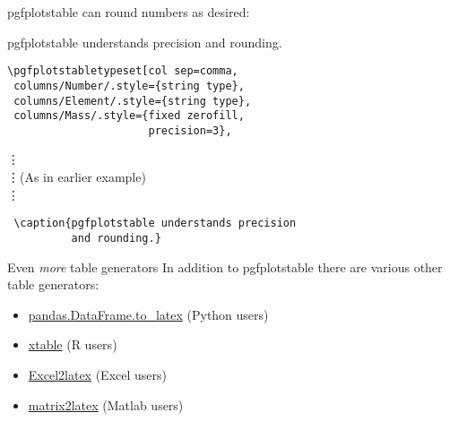 \begin{frame}{}
pgfplotstable can round numbers as desired:
  \begin{table}
  	\caption{pgfplotstable understands precision and rounding.}
  \end{table}
\end{frame}

\begin{frame}[fragile]{}
  \begin{lstlisting}
\pgfplotstabletypeset[col sep=comma,
 columns/Number/.style={string type},
 columns/Element/.style={string type},
 columns/Mass/.style={fixed zerofill, 
                      precision=3},
  \end{lstlisting}
\vspace{-0.5cm}\hspace{0.25cm}\vdots \\ \hspace{0.25cm}\vdots\quad(As in earlier example) \\ \hspace{0.25cm}\vdots
  \begin{lstlisting}
 \caption{pgfplotstable understands precision
          and rounding.}
  \end{lstlisting}
\end{frame}

\begin{frame}{Even \textit{more} table generators}
In addition to pgfplotstable there are various other table generators:
\begin{itemize}
\item \href{https://pandas.pydata.org/pandas-docs/stable/generated/pandas.DataFrame.to_latex.html}%
	{pandas.DataFrame.to\_latex} (Python users)
\item \href{https://www.rdocumentation.org/packages/xtable/versions/1.8-3/topics/xtable}%
	{xtable} (R users)
\item \href{https://ctan.org/pkg/excel2latex?lang=en}{Excel2latex}
	(Excel users)
\item \href{https://uk.mathworks.com/matlabcentral/fileexchange/4894-matrix2latex?s_tid=FX_rc2_behav}%
	{matrix2latex} (Matlab users)
  \end{itemize}
\end{frame}


